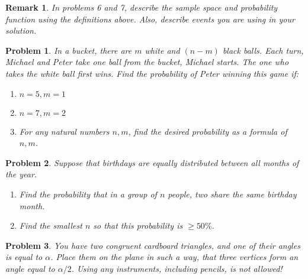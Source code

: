 \documentclass[a4paper,12pt]{article}
\theoremstyle{perfect}
\newtheorem{Remark}{Remark}
\newtheorem{prb}{Problem}
\begin{document}
\begin{Remark}
In problems 6 and 7, describe the sample space and probability function using the definitions above. Also, describe events you are using in your solution.
\end{Remark}

\begin{prb}
In a bucket, there are $m$ white and $(n-m)$ black balls. Each turn, Michael and Peter take one ball from the bucket, Michael starts. The one who takes the white ball first wins. Find the probability of Peter winning this game if:
\begin{enumerate}
\item $n=5, m=1$
\item $n=7, m=2$
\item For any natural numbers $n,m$, find the desired probability as a formula of $n,m$.
\end{enumerate}
\end{prb}


\begin{prb}
Suppose that birthdays are equally distributed between all months of the year.
\begin{enumerate}
\item Find the probability that in a group of  $n$ people, two share the same birthday month.
\item Find the smallest $n$ so that this probability is $\geq 50\%$.
\end{enumerate}
\end{prb} 

\begin{prb}
You have two congruent cardboard triangles, and one of their angles is equal to $\alpha$. 
Place them on the plane in such a way, that three vertices form an angle equal to $\alpha / 2$. Using any instruments, including pencils, is not allowed!
\end{prb}

 
\end{document}

